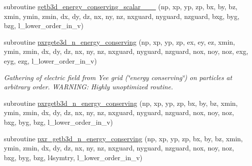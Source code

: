 \begin{DoxyCompactItemize}
\item 
subroutine \hyperlink{field__gathering_8_f90_a521bd3732f843934943ef8a923d5da72}{getb3d\+\_\+energy\+\_\+conserving\+\_\+scalar\+\_\+\_\+\_} (np, xp, yp, zp, bx, by, bz, xmin, ymin, zmin,                                                                                                                                                           dx, dy, dz, nx, ny, nz, nxguard, nyguard, nzguard,                                                                                                                                                   bxg, byg, bzg, l\+\_\+lower\+\_\+order\+\_\+in\+\_\+v)
\item 
subroutine \hyperlink{field__gathering_8_f90_aff764c0eb8ae48e31d7bb6f39467cabf}{pxrgete3d\+\_\+n\+\_\+energy\+\_\+conserving} (np, xp, yp, zp, ex, ey, ez, xmin, ymin, zmin,                                                                                                                                                                           dx, dy, dz, nx, ny, nz, nxguard, nyguard, nzguard,                                                                                                                                                   nox, noy, noz, exg, eyg, ezg, l\+\_\+lower\+\_\+order\+\_\+in\+\_\+v)
\begin{DoxyCompactList}\small\item\em Gathering of electric field from Yee grid (\char`\"{}energy conserving\char`\"{}) on particles at arbitrary order. W\+A\+R\+N\+I\+NG\+: Highly unoptimized routine. \end{DoxyCompactList}\item 
subroutine \hyperlink{field__gathering_8_f90_aa51d5771b10a0ee5f74ceda73388778e}{pxrgetb3d\+\_\+n\+\_\+energy\+\_\+conserving} (np, xp, yp, zp, bx, by, bz, xmin, ymin, zmin,                                                                                                                                                               dx, dy, dz, nx, ny, nz, nxguard, nyguard, nzguard,                                                                                                                                                   nox, noy, noz, bxg, byg, bzg, l\+\_\+lower\+\_\+order\+\_\+in\+\_\+v)
\item 
subroutine \hyperlink{field__gathering_8_f90_a3d18b5a2fca069b67c4e49c7d1559dd8}{pxr\+\_\+getb3d\+\_\+n\+\_\+energy\+\_\+conserving} (np, xp, yp, zp, bx, by, bz, xmin, ymin, zmin, dx, dy, dz, nx, ny, nz, nxguard, nyguard, nzguard,                                                                                                                                                       nox, noy, noz, bxg, byg, bzg, l4symtry, l\+\_\+lower\+\_\+order\+\_\+in\+\_\+v)

\end{DoxyCompactItemize}
